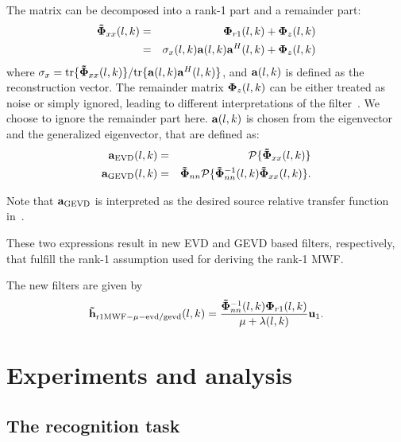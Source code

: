 \documentclass[review]{elsarticle}
\newif\ifproofread
\newcommand{\pfmarker}[1]{%
\ifproofread
\textcolor{red}{#1}%
\else
#1%
\fi
}
\newif\ifminorRNew
\newcommand{\pfminorNew}[1]{%
\ifminorRNew
\textcolor{red}{#1}%
\else
#1%
\fi
}
\begin{document}
The matrix can be decomposed into a rank-1 part and a remainder part:
\begin{eqnarray}\label{eq:r1appr}
\nonumber {\bf \tilde\Phi}_{xx}\pfmarker{(l,k)} &=& {\bf \Phi}_{r1}\pfmarker{(l,k)} + {\bf \Phi}_{z}\pfmarker{(l,k)} \\
         &=& \sigma_x\pfmarker{(l,k)} {\bf a}\pfmarker{(l,k)}{\bf a}^H\pfmarker{(l,k)} + {\bf \Phi}_{z}\pfmarker{(l,k)}
\end{eqnarray}
where $\sigma_x={\text{tr}}\{{\bf \tilde\Phi}_{xx}(l,k)\}/{\text{tr}}\{{\bf a}(l,k){\bf a}^H(l,k)\}$, and ${\bf a}(l,k)$ is defined as the reconstruction vector. The remainder matrix ${\bf \Phi}_{z}(l,k)$ can be either treated as noise or simply ignored, leading to different interpretations of the filter~\cite{2014serizellow}. We choose to ignore the remainder part here. ${\bf a}(l,k)$ is chosen from the eigenvector and the generalized eigenvector, that are defined as:
\begin{eqnarray}
{\bf a}_{\text{EVD}}\pfmarker{(l,k)} &=& \mathcal{P} \{ {\bf \tilde\Phi}_{xx}\pfmarker{(l,k)} \}   \\
{\bf a}_{\text{GEVD}}\pfmarker{(l,k)} &=& \pfminorNew{{\bf \tilde\Phi}_{nn}}\mathcal{P} \{ {\bf \tilde\Phi}_{nn}^{-1}\pfmarker{(l,k)}{\bf \tilde\Phi}_{xx}\pfmarker{(l,k)} \}.
\end{eqnarray}
\pfminorNew{Note that ${\bf a}_{\text{GEVD}}$ is interpreted as the desired source relative transfer function in~\cite{2009MultichEigen}.} \pfmarker{These two expressions result in new EVD and GEVD based filters, respectively, that fulfill the rank-1 assumption used for deriving the rank-1 MWF.} The new filters are given by
\begin{equation}\label{eq:r1cmwf}
{\bf \tilde h}_{\text{r1MWF}-\mu-\text{evd/gevd}}\pfmarker{(l,k)}=\frac{{\bf \tilde\Phi}_{nn}^{-1}\pfmarker{(l,k)}{\bf \Phi}_{r1}\pfmarker{(l,k)}}{\mu+\lambda\pfmarker{(l,k)}}{\bf u}_{1}.
\end{equation}


\section{Experiments and analysis}

\subsection{The recognition task}
\end{document}
